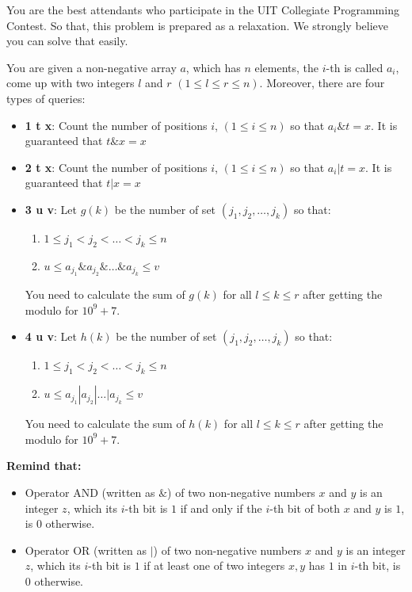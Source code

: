 \documentclass[12pt]{article}
\begin{document}
	You are the best attendants who participate in the UIT Collegiate Programming Contest. So that, this problem is prepared as a relaxation. We strongly believe you can solve that easily.
	
	You are given a non-negative array $a$, which has $n$ elements, the $i$-th is called $a_i$, come up with two integers $l$ and $r$ $(1 \le l \le r \le n)$. Moreover, there are four types of queries:
	
	\begin{itemize}
		\item {\selectfont \textbf{1 t x}}: Count the number of positions $i$, $(1 \le i \le n)$ so that $a_i \& t = x$. It is guaranteed that $t \& x = x$
		\item {\selectfont \textbf{2 t x}}: Count the number of positions $i$, $(1 \le i \le n)$ so that $a_i | t = x$. It is guaranteed that $t | x = x$
		\item {\selectfont \textbf{3 u v}}: Let $g(k)$ be the number of set $(j_1,j_2,\dots,j_k)$ so that:
		\begin{enumerate}
			\item $1 \le j_1 < j_2 < \dots < j_k \le n$
			\item $u \le a_{j_1} \& a_{j_2} \& \dots \& a_{j_k} \le v$
		\end{enumerate}
		
		You need to calculate the sum of $g(k)$ for all $l \le k \le r$ after getting the modulo for $10^9+7$.
		
		\item {\selectfont \textbf{4 u v}}: Let $h(k)$ be the number of set $(j_1,j_2,\dots,j_k)$ so that:
		\begin{enumerate}
			\item $1 \le j_1 < j_2 < \dots < j_k \le n$
			\item $u \le a_{j_1} | a_{j_2} | \dots | a_{j_k} \le v$
		\end{enumerate}
		
		You need to calculate the sum of $h(k)$ for all $l \le k \le r$ after getting the modulo for $10^9+7$.
		
	\end{itemize}
	
	\textbf{Remind that:}
	
	\begin{itemize}
		\item Operator AND (written as $\&$) of two non-negative numbers $x$ and $y$ is an integer $z$, which its $i$-th bit is $1$ if and only if the $i$-th bit of both $x$ and $y$ is $1$, is $0$ otherwise.
		\item Operator OR (written as $|$) of two non-negative numbers $x$ and $y$ is an integer $z$, which its $i$-th bit is $1$ if at least one of two integers $x,y$ has $1$ in $i$-th bit, is $0$ otherwise.
	\end{itemize}
	
\end{document}
